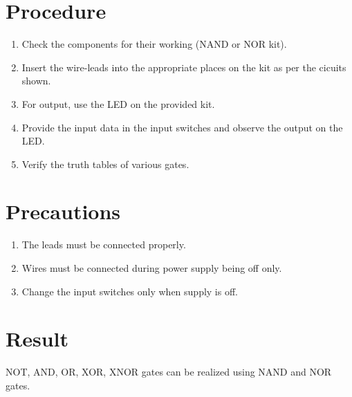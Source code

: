 \section{Procedure}
	\begin{enumerate}
		\tightlist
		\item Check the components for their working (NAND or NOR kit).
		\item Insert the wire-leads into the appropriate places on the kit as per the cicuits shown.
		\item For output, use the LED on the provided kit.
		\item Provide the input data in the input switches and observe the output on the LED.
		\item Verify the truth tables of various gates.
	\end{enumerate}

\section{Precautions}
	\begin{enumerate}
		\tightlist
		\item The leads must be connected properly.
		\item Wires must be connected during power supply being off only.
		\item Change the input switches only when supply is off.
	\end{enumerate}

\section{Result}
	NOT, AND, OR, XOR, XNOR gates can be realized using NAND and NOR gates.